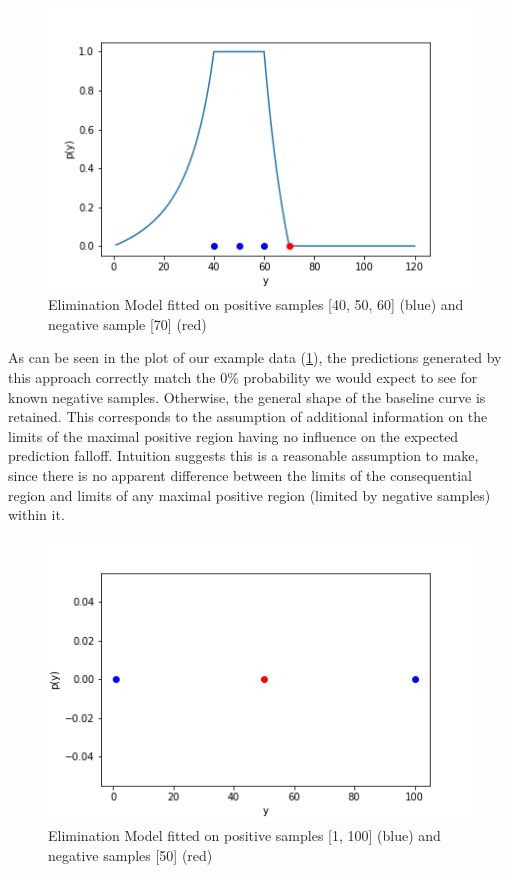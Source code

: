 \documentclass[12pt, ]{scrartcl}
\begin{document}
\begin{multicols}{2}
\begin{figure}[H]
	\centering
	\includegraphics[scale=0.5]{graphics/elimination_model}
	\caption{Elimination Model fitted on positive samples [40, 50, 60] (blue) and negative sample [70] (red)}
	\label{fig:elim}
\end{figure}

As can be seen in the plot of our example data (\cref{fig:elim}), the predictions generated by this approach correctly match the 0\% probability we would expect to see for known negative samples.
Otherwise, the general shape of the baseline curve is retained.
This corresponds to the assumption of additional information on the limits of the maximal positive region having no influence on the expected prediction falloff.
Intuition suggests this is a reasonable assumption to make, since there is no apparent difference between the limits of the consequential region and limits of any maximal positive region (limited by negative samples) within it.

\begin{figure}[H]
	\centering
	\includegraphics[scale=0.5]{graphics/elimination_model_multiple_regions.png}
	\caption{Elimination Model fitted on positive samples [1, 100] (blue) and negative samples [50] (red)}
	\label{fig:elim1r}
\end{figure}


\end{multicols}
\end{document}
